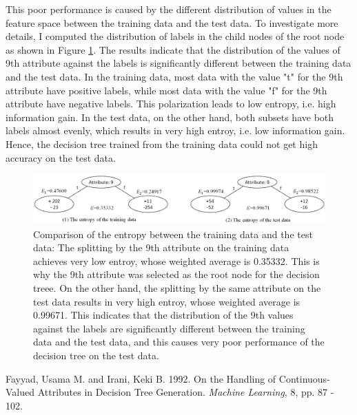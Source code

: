 \begin{enumerate}
This poor performance is caused by the different distribution of values in the feature space between the training data and the test data. To investigate more details, I computed the distribution of labels in the child nodes of the root node as shown in Figure \ref{fig:comparison}. The results indicate that the distribution of the values of 9th attribute against the labels is significantly different between the training data and the test data. In the training data, most data with the value "t" for the 9th attribute have positive labels, while most data with the value "f" for the 9th attribute have negative labels. This polarization leads to low entropy, i.e. high information gain. In the test data, on the other hand, both subsets have both labels almost evenly, which results in very high entroy, i.e. low information gain. Hence, the decision tree trained from the training data could not get high accuracy on the test data.

\begin{figure}[hbtp]
\centering
\includegraphics[width=150mm]{figure2.png}
\caption{Comparison of the entropy between the training data and the test data: The splitting by the 9th attribute on the training data achieves very low entroy, whose weighted average is 0.35332. This is why the 9th attribute was selected as the root node for the decision treee. On the other hand, the splitting by the same attribute on the test data results in very high entroy, whose weighted average is 0.99671. This indicates that the distribution of the 9th values against the labels are significantly different between the training data and the test data, and this causes very poor performance of the decision tree on the test data.}
\label{fig:comparison}
\end{figure}

\end{enumerate}

\begin{thebibliography}{9}
 Fayyad, Usama M. and Irani, Keki B. 1992. On the Handling of Continuous-Valued Attributes in Decision Tree Generation. {\it Machine Learning}, 8, pp. 87 - 102.
\end{thebibliography}



